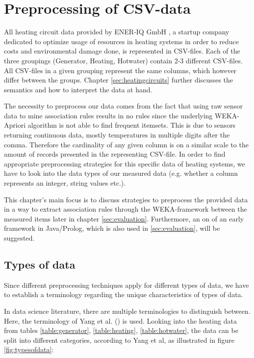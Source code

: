 \documentclass[bachelor,english]{info1thesis}
\begin{document}
\section{Preprocessing of CSV-data}
\label{sec:preprocessing}
All heating circuit data provided by ENER-IQ GmbH \cite{eneriq}, a startup company dedicated to optimize usage of resources in heating systems in order to reduce costs and environmental damage done, is represented in CSV-files. Each of the three groupings (Generator, Heating, Hotwater) contain 2-3 different CSV-files. All CSV-files in a given grouping represent the same columns, which however differ between the groups. Chapter \ref{sec:heatingcircuits} further discusses the semantics and how to interpret the data at hand.

The necessity to preprocess our data comes from the fact that using raw sensor data to mine association rules results in no rules since the underlying WEKA-Apriori algorithm is not able to find frequent itemsets. This is due to sensors returning continuous data, mostly temperatures in multiple digits after the comma. Therefore the cardinality of any given column is on a similar scale to the amount of records presented in the representing CSV-file. 
In order to find appropriate preprocessing strategies for this specific data of heating systems, we have to look into the data types of our measured data (e.g. whether a column represents an integer, string values etc.).

This chapter's main focus is to discuss strategies to preprocess the provided data in a way to extract association rules through the WEKA-framework between the measured items later in chapter \ref{sec:evaluation}. Furthermore, an on of an early framework in Java/Prolog, which is also used in \ref{sec:evaluation}, will be suggested.

\subsection{Types of data}
\label{typesofdata}
Since different preprocessing techniques apply for different types of data, we have to establish a terminology regarding the unique characteristics of types of data.

In data science literature, there are multiple terminologies to distinguish between. Here, the terminology of Yang et al. (\cite{yang2009discretization}) is used.
Looking into the heating data from tables \ref{table:generator}, \ref{table:heating}, \ref{table:hotwater}, the data can be split into different categories, according to Yang et al, as illustrated in figure \ref{fig:typesofdata}:
\end{document}
